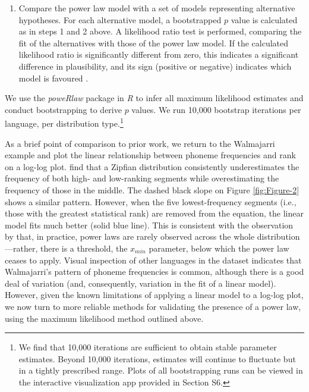 \begin{enumerate}
\item
  Compare the power law model with a set of models representing alternative hypotheses. For each alternative model, a bootstrapped \(p\) value is calculated as in steps 1 and 2 above. A likelihood ratio test is performed, comparing the fit of the alternatives with those of the power law model. If the calculated likelihood ratio is significantly different from zero, this indicates a significant difference in plausibility, and its sign (positive or negative) indicates which model is favoured \autocite[p.~680]{clauset_power-law_2009}.
\end{enumerate}

We use the \emph{poweRlaw} package \autocite{gillespie_fitting_2014} in \emph{R} \autocite{r-core-team_r_2017} to infer all maximum likelihood estimates and conduct bootstrapping to derive \(p\) values. We run 10,000 bootstrap iterations per language, per distribution type.\footnote{We find that 10,000 iterations are sufficient to obtain stable parameter estimates. Beyond 10,000 iterations, estimates will continue to fluctuate but in a tightly prescribed range. Plots of all bootstrapping runs can be viewed in the interactive visualization app provided in Section S6.}

As a brief point of comparison to prior work, we return to the Walmajarri example and plot the linear relationship between phoneme frequencies and rank on a log-log plot. \textcite{tambovtsev_phoneme_2007} find that a Zipfian distribution consistently underestimates the frequency of both high- and low-ranking segments while overestimating the frequency of those in the middle. The dashed black slope on Figure \ref{fig:Figure-2} shows a similar pattern. However, when the five lowest-frequency segments (i.e., those with the greatest statistical rank) are removed from the equation, the linear model fits much better (solid blue line). This is consistent with the observation by \textcite{clauset_power-law_2009} that, in practice, power laws are rarely observed across the whole distribution---rather, there is a threshold, the \(x_{min}\) parameter, below which the power law ceases to apply. Visual inspection of other languages in the dataset indicates that Walmajarri's pattern of phoneme frequencies is common, although there is a good deal of variation (and, consequently, variation in the fit of a linear model). However, given the known limitations of applying a linear model to a log-log plot, we now turn to more reliable methods for validating the presence of a power law, using the maximum likelihood method outlined above.

